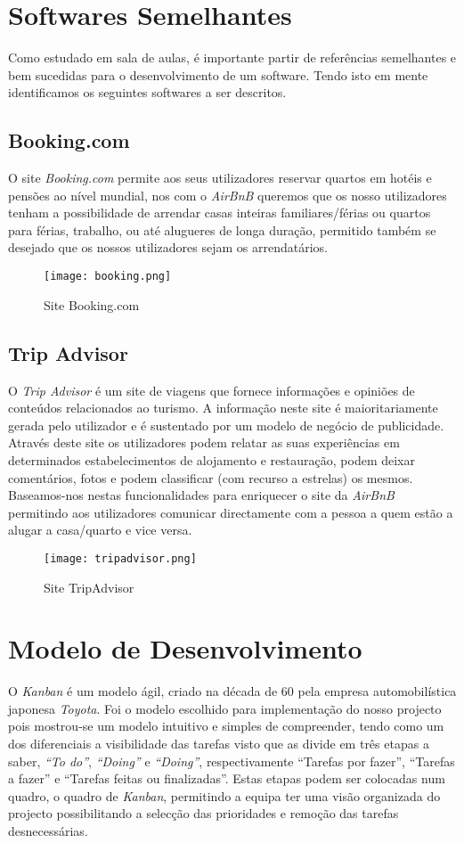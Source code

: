 \documentclass[a4paper]{article}
\begin{document}
\section{Softwares Semelhantes}
Como estudado em sala de aulas, é importante partir de referências semelhantes e bem sucedidas para o desenvolvimento de um software. Tendo isto em mente identificamos os seguintes softwares a ser descritos.
\subsection{Booking.com}
O site \textit{Booking.com} permite aos seus utilizadores reservar quartos em hotéis e pensões ao nível mundial, nos com o \textit{AirBnB} queremos que os nosso utilizadores tenham a possibilidade de arrendar casas inteiras familiares/férias ou quartos para férias, trabalho, ou até alugueres de longa duração, permitido também se desejado que os nossos utilizadores sejam os arrendatários. 

\begin{figure}[H]
    \centering
    \texttt{[image: booking.png]}    
    \caption{Site Booking.com\texttrademark}
\end{figure}

\newpage
\subsection{Trip Advisor}
O \textit{Trip Advisor} é um site de viagens que fornece informações e opiniões de conteúdos relacionados ao turismo. A informação neste site é maioritariamente gerada pelo utilizador e é sustentado por um modelo de negócio de publicidade.
Através deste site os utilizadores podem relatar as suas experiências em determinados estabelecimentos de alojamento e restauração, podem deixar comentários, fotos e podem classificar (com recurso a estrelas) os mesmos.
Baseamos-nos nestas funcionalidades para enriquecer o site da \textit{AirBnB} permitindo aos utilizadores comunicar directamente com a pessoa a quem estão a alugar a casa/quarto e vice versa.

\begin{figure}[H]
    \centering
    \texttt{[image: tripadvisor.png]}
    \caption{Site TripAdvisor\texttrademark}
    \label{fig:tripadv}
\end{figure}

\newpage
\section{Modelo de Desenvolvimento}
O \textit{Kanban} é um modelo ágil, criado na década de 60 pela empresa automobilística japonesa \textit{Toyota}.
Foi o modelo escolhido para implementação do nosso projecto pois mostrou-se um modelo intuitivo e simples de compreender, tendo como um dos diferenciais a visibilidade das tarefas visto que as divide em três etapas a saber, \textit{“To do”}, \textit{“Doing”} e \textit{“Doing”}, respectivamente “Tarefas por fazer”, “Tarefas a fazer” e “Tarefas feitas ou finalizadas”. Estas etapas podem ser colocadas num quadro, o quadro de \textit{Kanban}, permitindo a equipa ter uma visão organizada do projecto possibilitando a selecção das prioridades e remoção das tarefas desnecessárias.
\end{document}
